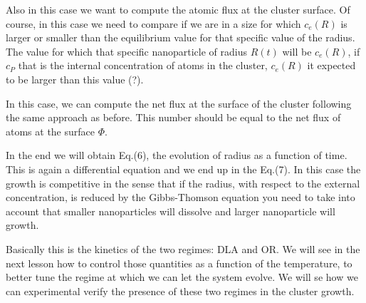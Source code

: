 \documentclass[../main/main.tex]{subfiles}
\begin{document}
Also in this case we want to compute the atomic flux at the cluster surface. Of course, in this case we need to compare if we are in a size for which \( c_e (R) \) is larger or smaller than the equilibrium value for that specific value of the radius. The value for which that specific nanoparticle of radius \( R(t) \) will be \( c_e (R) \), if \( c_P \) that is the internal concentration of atoms in the cluster, \( c_e(R) \) it expected to be larger than this value (?).

In this case, we can compute the net flux at the surface of the cluster following the same approach as before.
This number should be equal to the net flux of atoms at the surface \( \Phi  \).

In the end we will obtain Eq.(6), the evolution of radius as a function of time. This is again a differential equation and we end up in the Eq.(7).
In this case the growth is competitive in the sense that if the radius, with respect to the external concentration, is reduced by the Gibbs-Thomson equation you need to take into account that smaller nanoparticles will dissolve and larger nanoparticle will growth.

Basically this is the kinetics of the two regimes: DLA and OR. We will see in the next lesson how to control those quantities as a function of the temperature, to better tune the regime at which we can let the system evolve. We will se how we can experimental verify the presence of these two regimes in the cluster growth.


\clearpage
\end{document}
